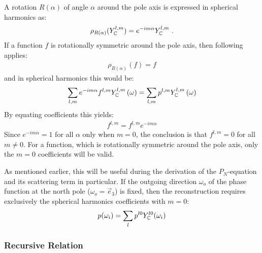 A rotation $R(\alpha)$ of angle $\alpha$ around the pole axis is expressed in spherical harmonics as:
\begin{align*}
\rho_{R(\alpha)}(Y_{\mathbb{C}}^{l,m}) = e^{-i m\alpha}Y_{\mathbb{C}}^{l,m}
\ .
\end{align*}
If a function $f$ is rotationally symmetric around the pole axis, then following applies:
\begin{align*}
\rho_{R(\alpha)}(f) = f
\end{align*}
and in spherical harmonics this would be:
\begin{align*}
\sum_{l,m}
{
e^{-i m\alpha}
f^{l,m}
Y_{\mathbb{C}}^{l,m} }\left(\omega\right)
=
\sum_{l,m}
{
p^{l,m}
Y_{\mathbb{C}}^{l,m}\left(\omega\right)
}
\end{align*}
By equating coefficients this yields:
\begin{align*}
f^{l,m} = f^{l,m}e^{-i m\alpha}
\end{align*}
Since $e^{-i m\alpha}=1$ for all $\alpha$ only when $m=0$, the conclusion is that $f^{l,m} = 0$ for all $m\ne0$. For a function, which is rotationally symmetric around the pole axis, only the $m=0$ coefficients will be valid.

As mentioned earlier, this will be useful during the derivation of the $P_N$-equation and its scattering term in particular. If the outgoing direction $\omega_o$ of the phase function at the north pole ($\omega_o=\vec{e}_3$) is fixed, then the reconstruction requires exclusively the spherical harmonics coefficients with $m=0$:
\begin{align}
\label{eq:sh_exp_phase}
p(\omega_i) =
\sum_l
{
p^{l0}
Y_{\mathbb{C}}^{l0}(\omega_i)
}
\end{align}

\subsubsection*{Recursive Relation}

